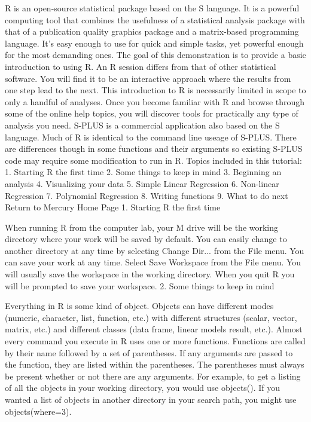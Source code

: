 { 


R is an open-source statistical package based on the S language. It is a powerful computing tool that combines the usefulness of a statistical analysis package with that of a publication quality graphics package and a matrix-based programming language. It's easy enough to use for quick and simple tasks, yet powerful enough for the most demanding ones. The goal of this demonstration is to provide a basic introduction to using R. An R session differs from that of other statistical software. You will find it to be an interactive approach where the results from one step lead to the next. This introduction to R is necessarily limited in scope to only a handful of analyses. Once you become familiar with R and browse through some of the online help topics, you will discover tools for practically any type of analysis you need. S-PLUS is a commercial application also based on the S language. Much of R is identical to the command line useage of S-PLUS. There are differences though in some functions and their arguments so existing S-PLUS code may require some modification to run in R. 
Topics included in this tutorial: 
1. Starting R the first time
2. Some things to keep in mind
3. Beginning an analysis
4. Visualizing your data
5. Simple Linear Regression
6. Non-linear Regression
7. Polynomial Regression
8. Writing functions
9. What to do next 
Return to Mercury Home Page 
1. Starting R the first time


When running R from the computer lab, your M drive will be the working directory where your work will be saved by default. You can easily change to another directory at any time by selecting Change Dir... from the File menu. 
You can save your work at any time. Select Save Workspace from the File menu. You will usually save the workspace in the working directory. When you quit R you will be prompted to save your workspace. 
2. Some things to keep in mind


Everything in R is some kind of object. Objects can have different modes (numeric, character, list, function, etc.) with different structures (scalar, vector, matrix, etc.) and different classes (data frame, linear models result, etc.). 
Almost every command you execute in R uses one or more functions. Functions are called by their name followed by a set of parentheses. If any arguments are passed to the function, they are listed within the parentheses. The parentheses must always be present whether or not there are any arguments. For example, to get a listing of all the objects in your working directory, you would use objects(). If you wanted a list of objects in another directory in your search path, you might use objects(where=3). 

}

